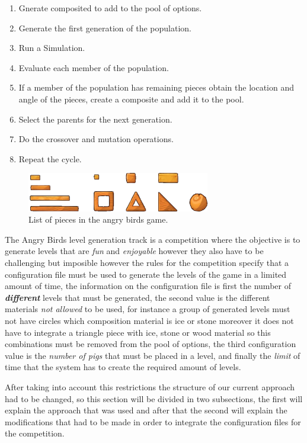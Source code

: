 \documentclass[conference]{IEEEtran}
\begin{document}
\begin{enumerate}
\item Gnerate composited to add to the pool of options.
\item Generate the first generation of the population.
\item Run a Simulation.
\item Evaluate each member of the population.
\item If a member of the population has remaining pieces obtain the location and
angle of the pieces, create a composite and add it to the pool.
\item Select the parents for the next generation.
\item Do the crossover and mutation operations.
\item Repeat the cycle.
\end{enumerate}

\begin{figure}[htbp]
\centerline{\includegraphics[width=80mm]{Images/list_pieces.png}}
\caption{List of pieces in the angry birds game.}
\label{piece_list}
\end{figure}


The Angry Birds level generation track is a competition where the objective is 
to generate levels that are \textit{fun} and \textit{enjoyable} however they 
also have to be challenging but imposible however the rules for the competition 
specify that a configuration file must be used to
generate the levels of the game in a limited amount of time, the information on
the configuration file is first the number of \textbf{\textit{different}} levels
that must be generated, the second value is the different materials \textit{not
allowed} to be used, for instance a group of generated levels must not have
circles which composition material is ice or stone moreover it does not have to
integrate a triangle piece with ice, stone or wood material so this combinations
must be removed from the pool of options, the third configuration value is the
\textit{number of pigs} that must be placed in a level, and finally the
\textit{limit} of time that the system has to create the required amount of
levels.

After taking into account this restrictions the structure of our current approach
had to be changed, so this section will be divided in two subsections, the first
will explain the approach that was used and after that the second will explain the
modifications that had to be made in order to integrate the configuration files
for the competition. 
\end{document}
